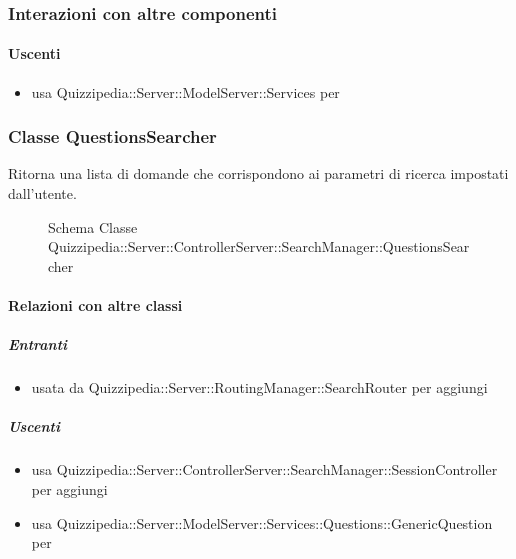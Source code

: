 \subsubsection{Interazioni con altre componenti}
\paragraph{Uscenti}
\begin{itemize}
\item usa Quizzipedia::Server::ModelServer::Services per 
\end{itemize}
\subsubsection{Classe QuestionsSearcher}
Ritorna una lista di domande che corrispondono ai parametri di ricerca impostati dall'utente.
\begin{figure}[H]
\centering
\noindent{}
\caption[Schema Classe QuestionsSearcher]{Schema Classe Quizzipedia::Server::ControllerServer::SearchManager::QuestionsSearcher}
\end{figure}
\paragraph{Relazioni con altre classi}
\subparagraph{Entranti}
\begin{itemize}
\item usata da Quizzipedia::Server::RoutingManager::SearchRouter per aggiungi
\end{itemize}
\subparagraph{Uscenti}
\begin{itemize}
\item usa Quizzipedia::Server::ControllerServer::SearchManager::SessionController per aggiungi
\item usa Quizzipedia::Server::ModelServer::Services::Questions::GenericQuestion per 
\end{itemize}
